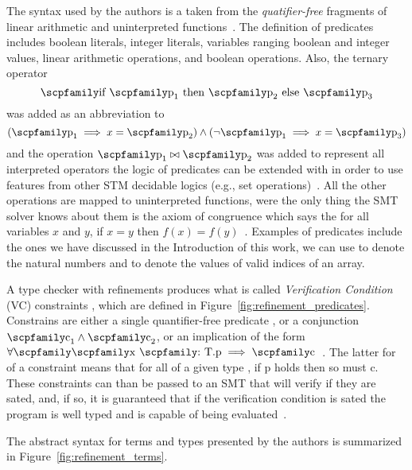 \documentclass[
  oneside,
  english,
  coorientadorbanca,
  noabntexcite
]{ufsc-thesis-rn46-2019}
\newcommand{\codett}[1]{\text{\scpfamily#1}}
\newcommand{\code}[1]{\text{\scpfamily\setlength\spaceskip{0.35em}#1}}
\newcommand{\typer}[2]{\code{#1 \codett{:} #2}}
\begin{document}
The syntax used by the authors is a taken from the \textit{quatifier-free} fragments of linear arithmetic and uninterpreted functions~\cite{jhala2020tutorial}.
The definition of predicates \code{p} includes boolean literals, integer literals, variables ranging boolean and integer values, linear arithmetic operations, and boolean operations.
Also, the ternary operator
\begin{equation*}
  \code{if $\code{p}_1$ then $\code{p}_2$ else $\code{p}_3$}
\end{equation*}
was added as an abbreviation to
\begin{equation*}
  (\code{p}_1 \implies x = \code{p}_2)\land(\lnot \code{p}_1 \implies x = \code{p}_3)
\end{equation*}
and the operation $\code{p}_1\bowtie\code{p}_2$ was added to represent all interpreted operators the logic of predicates can be extended with in order to use features from other STM decidable logics (e.g., set operations)~\cite{jhala2020tutorial}.
All the other operations are mapped to uninterpreted functions, were the only thing the SMT solver knows about them is the axiom of congruence which says the for all variables $x$ and $y$, if $x = y$ then $f(x) = f(y)$~\cite{jhala2020tutorial}.
Examples of predicates include the ones we have discussed in the Introduction of this work, we can use \code{0 <= v} to denote the natural numbers and \code{0 <= v \&\& v = length(x)} to denote the values of valid indices of an array.

A type checker with refinements produces what is called \textit{Verification Condition} (VC) constraints \code{c}, which are defined in Figure~\ref{fig:refinement_predicates}.
Constrains are either a single quantifier-free predicate \code{p}, or a conjunction $\code{c}_1 \land \code{c}_2$, or an implication of the form $\forall\code{\typer{x}{T}.p}\implies\code{c}$~\cite{jhala2020tutorial}.
The latter for of a constraint means that for all \code{x} of a given type \code{T}, if p holds then so must c.
These constraints can than be passed to an SMT that will verify if they are sated, and, if so, it is guaranteed that if the verification condition is sated the program is well typed and is capable of being evaluated~\cite{jhala2020tutorial}.

The abstract syntax for terms and types presented by the authors is summarized in Figure~\ref{fig:refinement_terms}.
\end{document}
